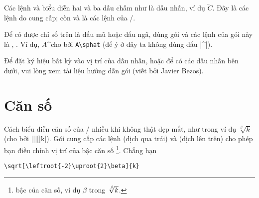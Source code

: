 \documentclass[11pt,leqno,titlepage,openany,oneside]{amsldoc}[1999/12/13]
\begin{document}
\medskip
Các lệnh  và  biểu diễn hai và ba dấu chấm
như là dấu nhấn, ví dụ $\dddot C$. Đây là các lệnh do  cung cấp;
còn  và  là các lệnh của \latex/.

\medskip
Để có được chỉ số trên là dấu mũ hoặc dấu ngã, dùng gói 
và các lệnh của gói này là , . Ví dụ,
$A\sphat$\space\space cho bởi \verb'A\sphat' (để ý ở đây ta không dùng dấu |^|).

\medskip
Để đặt ký hiệu bất kỳ vào vị trí của dấu nhấn, hoặc để có các dấu nhấn
bên dưới, vui lòng xem tài liệu hướng dẫn gói (viết bởi Javier Bezos).

\section{Căn số}

Cách biểu diễn căn số của \latex/ nhiều khi không thật đẹp mắt, như
trong ví dụ $\sqrt[\beta]{k}$ (cho bởi |\sqrt||[\beta]{k}|). 
Gói  cung cấp các lệnh  (dịch qua trái) và 
(dịch lên trên)
cho phép bạn điều chỉnh vị trí của bậc căn số%
\footnote{bậc của căn số, ví dụ $\beta$ trong $\sqrt[\leftroot{-2}\uproot{2}\beta]{k}$.}.
Chẳng hạn

\medskip
\begin{verbatim}
\sqrt[\leftroot{-2}\uproot{2}\beta]{k}
\end{verbatim}
\end{document}
